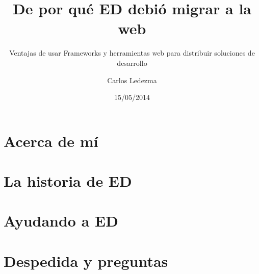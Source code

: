 \documentclass[9pt]{beamer}
\title{De por qué ED debió migrar a la web}
\subtitle{Ventajas de usar Frameworks y herramientas web para distribuir
          soluciones de desarrollo}
\author{Carlos Ledezma}
\institute{Akdemia}
\date{15/05/2014}
\begin{document}
  \frame{\titlepage}

  \frame{\tableofcontents}

  \section{Acerca de mí}
    

  \section{La historia de ED}
    

  \section{Ayudando a ED}
    

  \section{Despedida y preguntas}
    
\end{document}
